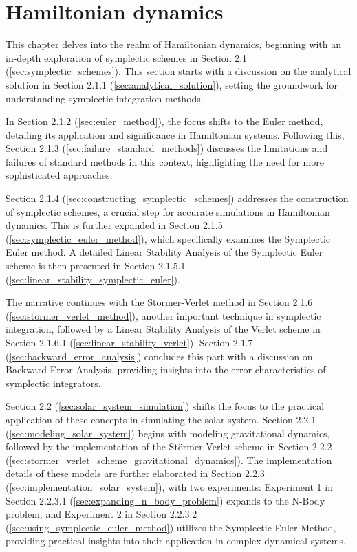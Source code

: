\documentclass{report}
\begin{document}
\chapter{Hamiltonian dynamics}
\label{sec:hamiltonian_dynamics}

This chapter delves into the realm of Hamiltonian dynamics, beginning with an in-depth exploration of symplectic schemes in Section 2.1 (\ref{sec:symplectic_schemes}). This section starts with a discussion on the analytical solution in Section 2.1.1 (\ref{sec:analytical_solution}), setting the groundwork for understanding symplectic integration methods.

In Section 2.1.2 (\ref{sec:euler_method}), the focus shifts to the Euler method, detailing its application and significance in Hamiltonian systems. Following this, Section 2.1.3 (\ref{sec:failure_standard_methods}) discusses the limitations and failures of standard methods in this context, highlighting the need for more sophisticated approaches.

Section 2.1.4 (\ref{sec:constructing_symplectic_schemes}) addresses the construction of symplectic schemes, a crucial step for accurate simulations in Hamiltonian dynamics. This is further expanded in Section 2.1.5 (\ref{sec:symplectic_euler_method}), which specifically examines the Symplectic Euler method. A detailed Linear Stability Analysis of the Symplectic Euler scheme is then presented in Section 2.1.5.1 (\ref{sec:linear_stability_symplectic_euler}).

The narrative continues with the Stormer-Verlet method in Section 2.1.6 (\ref{sec:stormer_verlet_method}), another important technique in symplectic integration, followed by a Linear Stability Analysis of the Verlet scheme in Section 2.1.6.1 (\ref{sec:linear_stability_verlet}). Section 2.1.7 (\ref{sec:backward_error_analysis}) concludes this part with a discussion on Backward Error Analysis, providing insights into the error characteristics of symplectic integrators.

Section 2.2 (\ref{sec:solar_system_simulation}) shifts the focus to the practical application of these concepts in simulating the solar system. Section 2.2.1 (\ref{sec:modeling_solar_system}) begins with modeling gravitational dynamics, followed by the implementation of the Störmer-Verlet scheme in Section 2.2.2 (\ref{sec:stormer_verlet_scheme_gravitational_dynamics}). The implementation details of these models are further elaborated in Section 2.2.3 (\ref{sec:implementation_solar_system}), with two experiments: Experiment 1 in Section 2.2.3.1 (\ref{sec:expanding_n_body_problem}) expands to the N-Body problem, and Experiment 2 in Section 2.2.3.2 (\ref{sec:using_symplectic_euler_method}) utilizes the Symplectic Euler Method, providing practical insights into their application in complex dynamical systems.
\end{document}

